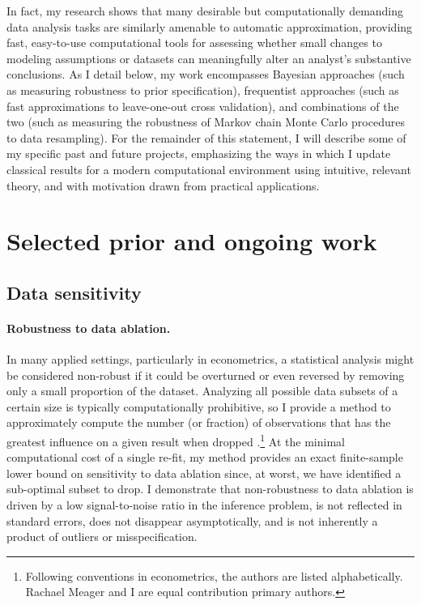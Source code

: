 In fact, my research shows that many desirable but computationally demanding
data analysis tasks are similarly amenable to automatic approximation, providing
fast, easy-to-use computational tools for assessing whether small changes to
modeling assumptions or datasets can meaningfully alter an analyst's substantive
conclusions.  As I detail below, my work encompasses Bayesian approaches (such
as measuring robustness to prior specification), frequentist approaches (such as
fast approximations to leave-one-out cross validation), and combinations of the
two (such as measuring the robustness of Markov chain Monte Carlo procedures to
data resampling). For the remainder of this statement, I will describe some of
my specific past and future projects, emphasizing the ways in which I update
classical results for a modern computational environment using intuitive,
relevant theory, and with motivation drawn from practical applications.

\section{Selected prior and ongoing work}

\subsection{Data sensitivity}

\paragraph{Robustness to data ablation.}
%
In many applied settings, particularly in econometrics, a statistical analysis
might be considered non-robust if it could be overturned or even reversed by
removing only a small proportion of the dataset. Analyzing all possible data
subsets of a certain size is typically computationally prohibitive, so I provide
a method to approximately compute the number (or fraction) of observations that
has the greatest influence on a given result when dropped
\citep{giordano:2020:amip}.\footnote{Following conventions in econometrics, the
authors are listed alphabetically.  Rachael Meager and I are equal contribution
primary authors.}
%
At the minimal computational cost of a single re-fit, my method provides an
exact finite-sample lower bound on sensitivity to data ablation since, at worst,
we have identified a sub-optimal subset to drop.
%
I demonstrate that non-robustness to data ablation is driven by a
low signal-to-noise ratio in the inference problem, is not reflected in standard
errors, does not disappear asymptotically, and is not inherently a product of
outliers or misspecification.

